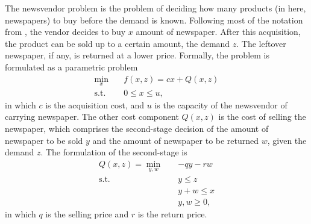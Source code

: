 \documentclass[twoside,11pt]{article}
\begin{document}
The newsvendor problem is the problem of deciding how many products (in here, newspapers) to buy before the demand is known.
Following most of the notation from \citet{birgeIntroductionStochasticProgramming2011}, the vendor decides to buy $x$ amount of newspaper. 
After this acquisition, the product can be sold up to a certain amount, the demand $z$.
The leftover newspaper, if any, is returned at a lower price.
Formally, the problem is formulated as a parametric problem
\begin{equation}\label{eq:deterministic-2sp-ul}
\begin{split}
    \min_{x} \quad & f(x,z) = c x + Q(x,z) \\
    \textrm{s.t.} \quad & 0\le x\le u
,\end{split}
\end{equation}
in which $c$ is the acquisition cost, and $u$ is the capacity of the newsvendor of carrying newspaper.
The other cost component $Q(x,z)$ is the cost of selling the newspaper, which comprises the second-stage decision of the amount of newspaper to be sold $y$ and the amount of newspaper to be returned $w$, given the demand $z$.
The formulation of the second-stage is
\begin{equation}\label{eq:deterministic-2sp-ll}
\begin{split}
    Q(x,z) = \min_{y,w} \quad & -q y - r w \\
    \textrm{s.t.} \quad & y\le z \\
      & y+w \le x \\
      & y,w \ge 0
,\end{split}
\end{equation}
in which $q$ is the selling price and $r$ is the return price.


\end{document}
